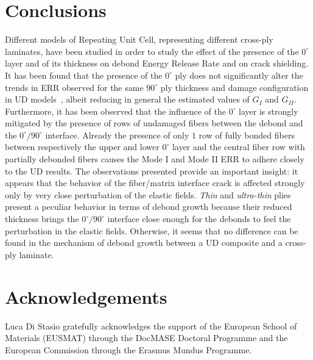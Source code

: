 \documentclass[review]{elsarticle}
\begin{document}

\section{Conclusions}

Different models of Repeating Unit Cell, representing different cross-ply laminates, have been studied in order to study the effect of the presence of the $0^{\circ}$ layer and of its thickness on debond Energy Release Rate and on crack shielding. It has been found that the presence of the $0^{\circ}$ ply does not significantly alter the trends in ERR observed for the same $90^{\circ}$ ply thickness and damage configuration in UD models~\cite{DiStasio2019}, albeit reducing in general the estimated values of $G_{I}$ and $G_{II}$. Furthermore, it has been observed that the influence of the $0^{\circ}$ layer is strongly mitigated by the presence of rows of undamaged fibers between the debond and the $0^{\circ}/90^{\circ}$ interface. Already the presence of only $1$ row of fully bonded fibers between respectively the upper and lower $0^{\circ}$ layer and the central fiber row with partially debonded fibers causes the Mode I and Mode II ERR to adhere closely to the UD results. The observations presented provide an important insight: it appears that the behavior of the fiber/matrix interface crack is affected strongly only by very close perturbation of the elastic fields. \emph{Thin} and \emph{ultra-thin} plies present a peculiar behavior in terms of debond growth because their reduced thickness brings the $0^{\circ}/90^{\circ}$ interface close enough for the debonds to feel the perturbation in the elastic fields. Otherwise, it seems that no difference can be found in the mechanism of debond growth between a UD composite and a cross-ply laminate.


\section*{Acknowledgements}

Luca Di Stasio gratefully acknowledges the support of the European School of Materials (EUSMAT) through the DocMASE Doctoral Programme and the European Commission through the Erasmus Mundus Programme.



\end{document}
